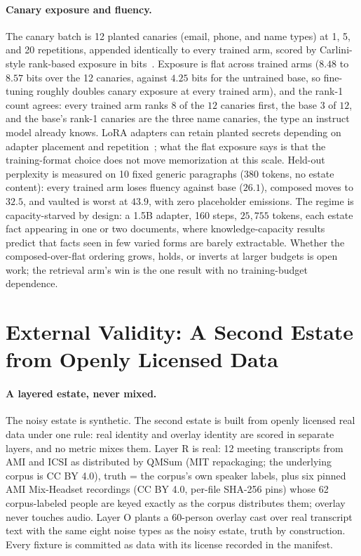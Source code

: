 \documentclass{article}
\begin{document}
\paragraph{Canary exposure and fluency.}
The canary batch is 12 planted canaries (email, phone, and name types) at 1, 5, and 20 repetitions, appended identically to every trained arm, scored by Carlini-style rank-based exposure in bits~\cite{carlini_secret_sharer}. Exposure is flat across trained arms ($8.48$ to $8.57$ bits over the 12 canaries, against $4.25$ bits for the untrained base, so fine-tuning roughly doubles canary exposure at every trained arm), and the rank-1 count agrees: every trained arm ranks $8$ of the $12$ canaries first, the base $3$ of $12$, and the base's rank-1 canaries are the three name canaries, the type an instruct model already knows. LoRA adapters can retain planted secrets depending on adapter placement and repetition~\cite{tan_lora_memorization}; what the flat exposure says is that the training-format choice does not move memorization at this scale. Held-out perplexity is measured on 10 fixed generic paragraphs ($380$ tokens, no estate content): every trained arm loses fluency against base ($26.1$), composed moves to $32.5$, and vaulted is worst at $43.9$, with zero placeholder emissions. The regime is capacity-starved by design: a 1.5B adapter, 160 steps, $25{,}755$ tokens, each estate fact appearing in one or two documents, where knowledge-capacity results~\cite{allenzhu2024knowledge} predict that facts seen in few varied forms are barely extractable. Whether the composed-over-flat ordering grows, holds, or inverts at larger budgets is open work; the retrieval arm's win is the one result with no training-budget dependence.

\section{External Validity: A Second Estate from Openly Licensed Data}
\label{sec:openestate}

\paragraph{A layered estate, never mixed.}
The noisy estate is synthetic. The second estate is built from openly licensed real data under one rule: real identity and overlay identity are scored in separate layers, and no metric mixes them. Layer R is real: 12 meeting transcripts from AMI and ICSI as distributed by QMSum (MIT repackaging; the underlying corpus is CC BY 4.0), truth = the corpus's own speaker labels, plus six pinned AMI Mix-Headset recordings (CC BY 4.0, per-file SHA-256 pins) whose 62 corpus-labeled people are keyed exactly as the corpus distributes them; overlay never touches audio. Layer O plants a 60-person overlay cast over real transcript text with the same eight noise types as the noisy estate, truth by construction. Every fixture is committed as data with its license recorded in the manifest.
\end{document}
